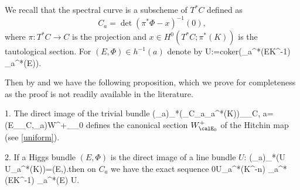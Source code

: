 We recall that the spectral curve is a subscheme of $T^*C$ defined as $$C_a=\det(\pi^*\Phi-x)^{-1}(0),$$ where $\pi:T^*C\to C$ is the projection and $x\in H^0(T^*C;\pi^*(K))$ is the tautological section.  For $(E,\Phi)\in h^{-1}(a)$ denote by \beq \label{definitionU}U:={\rm coker}(\pi_a^*(E\otimes K^{-1}) \pi_a^*(E)).\eeq
{}

Then by \cite[\S 5.1]{hitchin-stable} and \cite[\S 3.7]{beauville-etal}  we have the following proposition, which we prove for completeness as the proof is not readily available in the literature.

\begin{proposition}
\notready

	 1. The direct image of the trivial bundle   \beq \label{canonicalBNR} (\pi_a)_*(\calO_{C_a}\pi_a^*(K))\cong \calE_{\calO_C, a}=(E_{\calO_C},\Phi_a)\in W^+_{\calE_0} \eeq   defines  the canonical section  $W^+_{\calE_0}$ of the Hitchin map (see \eqref{uniform}).

	 2. If a Higgs bundle $(E,\Phi)$ is the direct image of a line bundle $U$:
	\beq \label{utoephi}(\pi_a)_*(U U\otimes \pi_a^*(K))=(E,\Phi).\eeq then  on $C_a$ we have the exact sequence \beq\label{exactu}0\to  U\otimes \pi_a^*(K^{-n}) \to \pi_a^*(E\otimes K^{-1}) \pi_a^*(E) \to U. \eeq
{}
\end{proposition}

